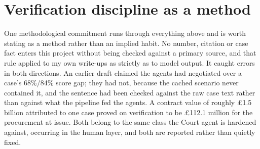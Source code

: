 \section{Verification discipline as a method}
\label{sec:verification-discipline}

One methodological commitment runs through everything above and is worth stating
as a method rather than an implied habit. No number, citation or case fact enters
this project without being checked against a primary source, and that rule applied
to my own write-ups as strictly as to model output. It caught errors in both
directions. An earlier draft claimed the agents had negotiated over a case's
68\%/84\% score gap; they had not, because the cached scenario never contained it,
and the sentence had been checked against the raw case text rather than against
what the pipeline fed the agents. A contract value of roughly \pounds1.5 billion
attributed to one case proved on verification to be \pounds112.1 million for the
procurement at issue. Both belong to the same class the Court agent is hardened
against, occurring in the human layer, and both are reported rather than quietly
fixed.